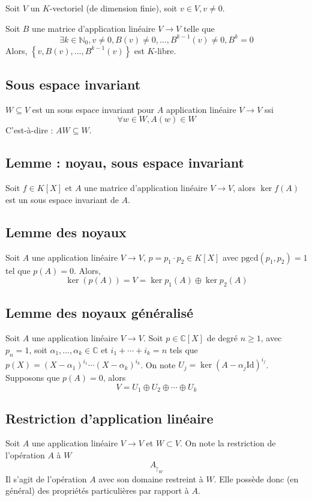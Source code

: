 \documentclass[a4paper,10pt]{article}
\newcommand{\ap}{ \rightarrow} %
\newcommand{\set}[1]{\left\lbrace #1 \right\rbrace } %
\newcommand{\NN}{\mathbb{N}} %
\newcommand{\CC}{\mathbb{C}} %
\newcommand{\pgcd}{\mathrm{pgcd}} %
\newcommand{\id}{\mathrm{Id}} %
\newcommand{\rstrct}[2]{{ #1 }_{\upharpoonright_{ #2 }}} %
\begin{document}
   Soit $V$ un $K$-vectoriel (de dimension finie), soit $v\in V, v\neq0$.

   Soit $B$ une matrice d'application linéaire $V\ap V$ telle que
    $$\exists k \in \NN_0, v\neq0, B(v)\neq 0, \hdots, B^{k-1}(v)\neq 0, B^{k}=0$$
   Alors, $\set{v,B(v), \hdots, B^{k-1}(v)}$ est $K$-libre.

  \subsection{Sous espace invariant}
   $W \subseteq V$ est un sous espace invariant pour $A$ application linéaire $V\ap V$ ssi
    $$\forall w \in W, A(w)\in W$$
   C'est-à-dire : $A W \subseteq W$.

  \subsection{Lemme : noyau, sous espace invariant} %
   Soit $f\in K[X]$ et $A$ une matrice d'application linéaire $V\ap V$, alors $\ker f(A)$ est un sous espace invariant de $A$.

  \subsection{Lemme des noyaux}%
   Soit $A$ une application linéaire $V\ap V$, $p=p_1\cdot p_2 \in K[X]$ avec $\pgcd(p_1,p_2)=1$ tel que $p(A)=0$. Alors,
    $$\ker(p(A))=V=\ker p_1(A) \oplus \ker p_2(A)$$

  \subsection{Lemme des noyaux généralisé}
   Soit $A$ une application linéaire $V\ap V$. Soit $p\in \CC[X]$ de degré $n\geq 1$, avec $p_n=1$, soit $\alpha_1, \hdots, \alpha_k \in \CC$ et $i_1+\cdots+i_k=n$ tels que $p(X)=(X-\alpha_1)^{i_1}\cdots (X-\alpha_k)^{i_k}$. On note $U_j=\ker(A-\alpha_j \id)^{i_j}$. Supposons que $p(A)=0$, alors
    $$V=U_1 \oplus U_2 \oplus \cdots \oplus U_k$$

  \subsection{Restriction d'application linéaire}
   Soit $A$ une application linéaire $V \ap V$ et $W\subset V$. On note la restriction de l'opération $A$ à $W$
    $$\rstrct{A}{W}$$
   Il s'agit de l'opération $A$ avec son domaine restreint à $W$. Elle possède donc (en général) des propriétés particulières par rapport à $A$.
\end{document}
